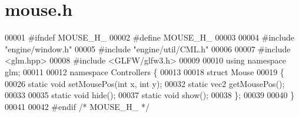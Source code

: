 \section{mouse.\+h}
\label{mouse_8h_source}

\begin{DoxyCode}
00001 \textcolor{preprocessor}{#ifndef MOUSE\_H\_}
00002 \textcolor{preprocessor}{#define MOUSE\_H\_}
00003 
00004 \textcolor{preprocessor}{#include "engine/window.h"}
00005 \textcolor{preprocessor}{#include "engine/util/CML.h"}
00006 
00007 \textcolor{preprocessor}{#include <glm.hpp>}
00008 \textcolor{preprocessor}{#include <GLFW/glfw3.h>}
00009 
00010 \textcolor{keyword}{using namespace }glm;
00011 
00012 \textcolor{keyword}{namespace }Controllers \{
00013     
00018     \textcolor{keyword}{struct }Mouse
00019     \{
00026         \textcolor{keyword}{static} \textcolor{keywordtype}{void}    setMousePos(\textcolor{keywordtype}{int} x, \textcolor{keywordtype}{int} y);
00032         \textcolor{keyword}{static} vec2 getMousePos();
00033 
00035         \textcolor{keyword}{static} \textcolor{keywordtype}{void}    hide();
00037         \textcolor{keyword}{static} \textcolor{keywordtype}{void}    show();
00038     \};
00039     
00040 \}
00041 
00042 \textcolor{preprocessor}{#endif }\textcolor{comment}{/* MOUSE\_H\_ */}\textcolor{preprocessor}{}
\end{DoxyCode}
